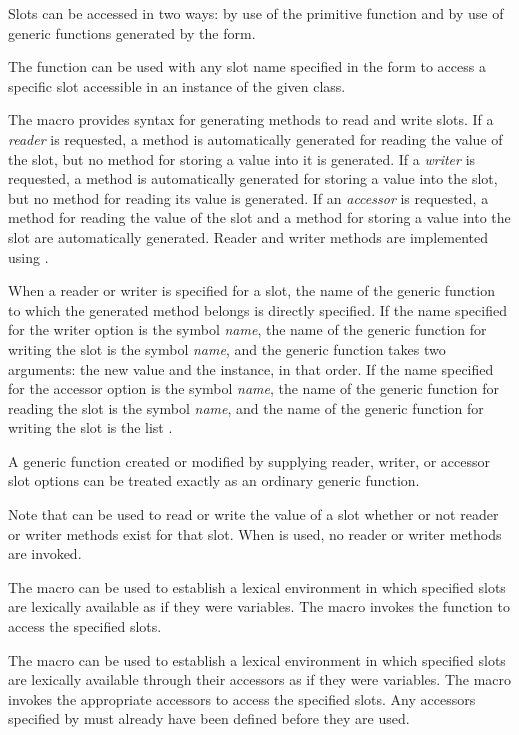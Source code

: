 Slots can be accessed in two ways: by use of the primitive function
 and by use of generic functions generated by the 
 form.

The function  can be used with any slot name
specified in the  form to access a specific slot
accessible in an instance of the given class.

The macro  provides syntax for generating methods to
read and write slots.  If a \emph{reader\/} is requested, a method is
automatically generated for reading the value of the slot, but no
method for storing a value into it is generated.  If a \emph{writer\/}
is requested, a method is automatically generated for storing a value
into the slot, but no method for reading its value is generated.  If
an \emph{accessor\/} is requested, a method for reading the value of
the slot and a method for storing a value into the slot are
automatically generated.  Reader and writer methods are implemented
using .

When a reader or writer is specified for a slot, the name of the
generic function to which the generated method belongs is directly
specified.  If the name specified for the writer option is the symbol
\emph{name}, the name of the generic function for writing the slot
is the symbol \emph{name}, and the generic function takes two
arguments: the new value and the instance, in that order.  If the name
specified for the accessor option is the symbol \emph{name}, the
name of the generic function for reading the slot is the symbol {\it
name\/}, and the name of the generic function for writing the slot is
the list .

A generic function created or modified by supplying reader, writer, or
accessor slot options can be treated exactly as an ordinary generic
function.

Note that  can be used to read or write the value of a
slot whether or not reader or writer methods exist for that slot.
When  is used, no reader or writer methods are
invoked.

The macro  can be used to establish a lexical
environment in which specified slots are lexically available as if they
were variables.  The macro  invokes the function 
 to access the specified slots.

The macro  can be used to establish a lexical
environment in which specified slots are lexically available through
their accessors as if they were variables.  The macro 
 invokes the appropriate accessors to access the
specified slots. Any accessors specified by  must
already have been defined before they are used.

